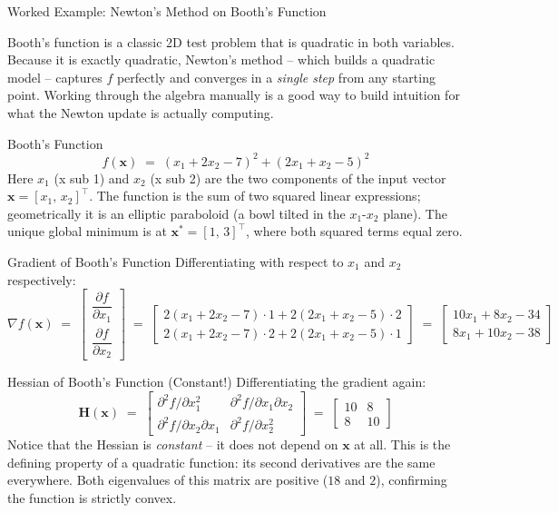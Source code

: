 \documentclass[aspectratio=169,10pt]{beamer}
\newcommand{\xbf}{\mathbf{x}}
\begin{document}
\begin{frame}[allowframebreaks]{Worked Example: Newton's Method on Booth's Function}

  Booth's function is a classic 2D test problem that is quadratic in both
  variables.  Because it is exactly quadratic, Newton's method -- which builds a
  quadratic model -- captures $f$ perfectly and converges in a \emph{single step}
  from any starting point.  Working through the algebra manually is a good way to
  build intuition for what the Newton update is actually computing.

  \begin{block}{Booth's Function}
    \[
      f(\xbf) \;=\; (x_1 + 2x_2 - 7)^2 + (2x_1 + x_2 - 5)^2
    \]
    Here $x_1$ (x sub 1) and $x_2$ (x sub 2) are the two components of the
    input vector $\xbf = [x_1,\, x_2]^\top$.  The function is the sum of two
    squared linear expressions; geometrically it is an elliptic paraboloid (a
    bowl tilted in the $x_1$-$x_2$ plane).  The unique global minimum is at
    $\xbf^* = [1,\,3]^\top$, where both squared terms equal zero.
  \end{block}

  \begin{block}{Gradient of Booth's Function}
    Differentiating with respect to $x_1$ and $x_2$ respectively:
    \[
      \nabla f(\xbf) \;=\;
      \begin{bmatrix}
        \dfrac{\partial f}{\partial x_1} \\[6pt]
        \dfrac{\partial f}{\partial x_2}
      \end{bmatrix}
      \;=\;
      \begin{bmatrix}
        2(x_1+2x_2-7)\cdot 1 + 2(2x_1+x_2-5)\cdot 2 \\
        2(x_1+2x_2-7)\cdot 2 + 2(2x_1+x_2-5)\cdot 1
      \end{bmatrix}
      \;=\;
      \begin{bmatrix}10x_1 + 8x_2 - 34\\8x_1 + 10x_2 - 38\end{bmatrix}
    \]
  \end{block}

  \begin{block}{Hessian of Booth's Function (Constant!)}
    Differentiating the gradient again:
    \[
      \mathbf{H}(\xbf) \;=\;
      \begin{bmatrix}
        \partial^2 f/\partial x_1^2 & \partial^2 f/\partial x_1\partial x_2 \\
        \partial^2 f/\partial x_2\partial x_1 & \partial^2 f/\partial x_2^2
      \end{bmatrix}
      \;=\;
      \begin{bmatrix}10 & 8\\8 & 10\end{bmatrix}
    \]
    Notice that the Hessian is \emph{constant} -- it does not depend on $\xbf$ at
    all.  This is the defining property of a quadratic function: its second
    derivatives are the same everywhere.  Both eigenvalues of this matrix are
    positive ($18$ and $2$), confirming the function is strictly convex.
  \end{block}


\end{frame}
\end{document}

